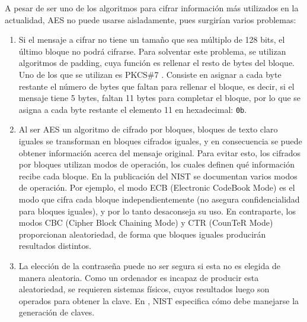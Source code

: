 A pesar de ser uno de los algoritmos para cifrar información más utilizados en la actualidad, AES no puede usarse aisladamente, pues surgirían varios problemas:

\begin{enumerate}[label={--}]
    \item Si el mensaje a cifrar no tiene un tamaño que sea múltiplo de 128 bits, el último bloque no podrá cifrarse. Para solventar este problema, se utilizan algoritmos de padding, cuya función es rellenar el resto de bytes del bloque. Uno de los que se utilizan es PKCS\#7 \cite[Sección~6.3]{rfc5652}. Consiste en asignar a cada byte restante el número de bytes que faltan para rellenar el bloque, es decir, si el mensaje tiene 5 bytes, faltan 11 bytes para completar el bloque, por lo que se asigna a cada byte restante el elemento 11 en hexadecimal: \texttt{0b}. 
    \item Al ser AES un algoritmo de cifrado por bloques, bloques de texto claro iguales se transforman en bloques cifrados iguales, y en consecuencia se puede obtener información acerca del mensaje original. Para evitar esto, los cifrados por bloques utilizan modos de operación, los cuales definen qué información recibe cada bloque. En la publicación \cite{nist80038a} del NIST se documentan varios modos de operación. Por ejemplo, el modo ECB (Electronic CodeBook Mode) es el modo que cifra cada bloque independientemente (no asegura confidencialidad para bloques iguales), y por lo tanto desaconseja su uso. En contraparte, los modos CBC (Cipher Block Chaining Mode) y CTR (CounTeR Mode) proporcionan aleatoriedad, de forma que bloques iguales producirán resultados distintos.
    \item La elección de la contraseña puede no ser segura si esta no es elegida de manera aleatoria. Como un ordenador es incapaz de producir esta aleatoriedad, se requieren sistemas físicos, cuyos resultados luego son operados para obtener la clave. En \cite{nist800133r2}, NIST especifica cómo debe manejarse la generación de claves. 
\end{enumerate}

